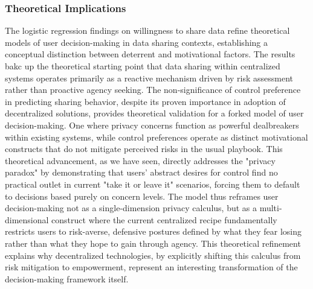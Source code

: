 	\subsubsection{Theoretical Implications}
	The logistic regression findings on willingness to share data refine theoretical models of user decision-making in data sharing contexts, establishing a conceptual distinction between deterrent and motivational factors. The results bakc up the theoretical starting point that data sharing within centralized systems operates primarily as a reactive mechanism driven by risk assessment rather than proactive agency seeking. The non-significance of control preference in predicting sharing behavior, despite its proven importance in adoption of decentralized solutions, provides theoretical validation for a forked model of user decision-making. One where privacy concerns function as powerful dealbreakers within existing systems, while control preferences operate as distinct motivational constructs that do not mitigate perceived risks in the usual playbook. This theoretical advancement, as we have seen, directly addresses the "privacy paradox" by demonstrating that users' abstract desires for control find no practical outlet in current "take it or leave it" scenarios, forcing them to default to decisions based purely on concern levels. The model thus reframes user decision-making not as a single-dimension privacy calculus, but as a multi-dimensional construct where the current centralized recipe fundamentally restricts users to risk-averse, defensive postures defined by what they fear losing rather than what they hope to gain through agency. This theoretical refinement explains why decentralized technologies, by explicitly shifting this calculus from risk mitigation to empowerment, represent an interesting transformation of the decision-making framework itself.

